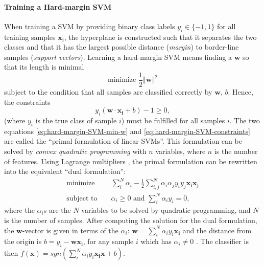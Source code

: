 \paragraph{Training a Hard-margin SVM}

When training a SVM by providing binary class labels $y_{i}\in\{-1,1\}$
for all training samples $\mathbf{x_{i}}$, the hyperplane is constructed
such that it separates the two classes and that it has the largest
possible distance (\emph{margin}) to border-line samples
(\emph{support vectors}). Learning a hard-margin
SVM means finding a $\mathbf{w}$ so that its length is minimal
\begin{equation}
\mbox{minimize }\frac{1}{2}\left\Vert \mathbf{w}\right\Vert ^{2}\label{eq:hard-margin-SVM-min-w}
\end{equation}
subject to the condition that all samples are classified correctly
by $\mathbf{w}$, $b$. Hence, the constraints 
\begin{equation}
y_{i}(\mathbf{w}\cdot\mathbf{x_{i}}+b)-1\geq0,\label{eq:hard-margin-SVM-constraints}
\end{equation}
(where $y_{i}$ is the true class of sample $i$) must be fulfilled
for all samples $i$. The two equations \ref{eq:hard-margin-SVM-min-w}
and \ref{eq:hard-margin-SVM-constraints} are called the ``primal
formulation of linear SVMs''. This formulation can be solved by \emph{convex
quadratic programming} with $n$ variables,
where $n$ is the number of features. Using Lagrange multipliers \cite{StatnikovGuyon2011},
the primal formulation can be rewritten into the equivalent ``dual
formulation'':
\begin{eqnarray}
\mbox{minimize } &  & \sum_{i}^{N}\alpha_{i}-\frac{1}{2}\sum_{i,j}^{N}\alpha_{i}\alpha_{j}y_{i}y_{j}\mathbf{x_{i}}\mathbf{x_{j}}\label{eq:hard-margin-SVM-dual-formulation-min-w}\\
\mbox{subject to } &  & \alpha_{i}\geq0\mbox{ and }\sum_{i}^{N}\alpha_{i}y_{i}=0,\nonumber 
\end{eqnarray}
where the $\alpha_{i}$s are the $N$ variables to be solved by quadratic
programming, and $N$ is the number of samples. After computing the
solution for the dual formulation, the $\mathbf{w}$-vector is given
in terms of the $\alpha_{i}$: $\mathbf{w}=\sum_{i}^{N}\alpha_{i}y_{i}\mathbf{x_{i}}$
and the distance from the origin is $b=y_{i}-\mathbf{w}\mathbf{x_{i}}$,
for any sample $i$ which has $\alpha_{i}\neq0$ \cite{BurbidgeBuxton2001}.
The classifier is then $f(\mathbf{x})=sgn(\sum_{i}^{N}\alpha_{i}y_{i}\mathbf{x_{i}}\mathbf{x}+b)$.

